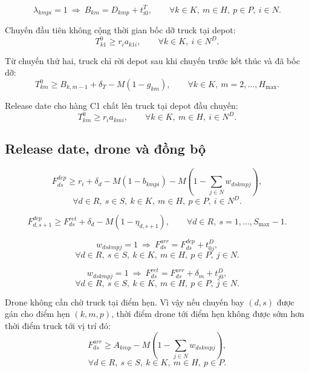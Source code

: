 \documentclass[12pt,a4paper]{article}
\begin{document}
\begin{equation}
  \lambda_{kmpi}=1\ \Longrightarrow\
  B_{km}=D_{kmp}+t^T_{i0},
  \qquad \forall k\in K,\ m\in H,\ p\in P,\ i\in N.
\end{equation}

Chuyến đầu tiên không cộng thời gian bốc dỡ truck tại depot:
\begin{equation}
  T^0_{k1}\ge r_i a_{k1i},
  \qquad \forall k\in K,\ i\in N^D.
\end{equation}

Từ chuyến thứ hai, truck chỉ rời depot sau khi chuyến trước kết thúc và đã bốc dỡ:
\begin{equation}
  T^0_{km}\ge B_{k,m-1}+\delta_T-M(1-g_{km}),
  \qquad \forall k\in K,\ m=2,\ldots,H_{\max}.
\end{equation}

Release date cho hàng C1 chất lên truck tại depot đầu chuyến:
\begin{equation}
  T^0_{km}\ge r_i a_{kmi},
  \qquad \forall k\in K,\ m\in H,\ i\in N^D.
\end{equation}

\subsection{Release date, drone và đồng bộ}

\begin{equation}
  F^{dep}_{ds}\ge r_i+\delta_d
  -M\left(1-b_{kmpi}\right)
  -M\left(1-\sum_{j\in N}w_{dskmpj}\right),
\end{equation}
\[
  \forall d\in R,\ s\in S,\ k\in K,\ m\in H,\ p\in P,\ i\in N^D.
\]

\begin{equation}
  F^{dep}_{d,s+1}\ge F^{ret}_{ds}+\delta_d-M(1-\eta_{d,s+1}),
  \qquad \forall d\in R,\ s=1,\ldots,S_{\max}-1.
\end{equation}

\begin{equation}
  w_{dskmpj}=1\ \Longrightarrow\
  F^{arr}_{ds}=F^{dep}_{ds}+t^D_{0j},
\end{equation}
\[
  \forall d\in R,\ s\in S,\ k\in K,\ m\in H,\ p\in P,\ j\in N.
\]

\begin{equation}
  w_{dskmpj}=1\ \Longrightarrow\
  F^{ret}_{ds}=F^{arr}_{ds}+\delta_m+t^D_{j0},
\end{equation}
\[
  \forall d\in R,\ s\in S,\ k\in K,\ m\in H,\ p\in P,\ j\in N.
\]

Drone không cần chờ truck tại điểm hẹn. Vì vậy nếu chuyến bay \((d,s)\) được gán
cho điểm hẹn \((k,m,p)\), thời điểm drone tới điểm hẹn không được sớm hơn thời điểm
truck tới vị trí đó:
\begin{equation}
  F^{arr}_{ds}\ge A_{kmp}-M\left(1-\sum_{j\in N}w_{dskmpj}\right),
\end{equation}
\[
  \forall d\in R,\ s\in S,\ k\in K,\ m\in H,\ p\in P.
\]
\end{document}
